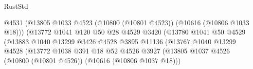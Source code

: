 \begin{lexlean}{RustStd}
\begin{coremodule}
                                                    @4531
                                                    (@13805
                                                      @1033
                                                      @4523
                                                      (@10800 (@10801 @4523))
                                                      (@10616 (@10806 @1033 @18)))
                                                    (@13772
                                                      @1041
                                                      @120
                                                      @50
                                                      @28
                                                      @4529
                                                      @3420
                                                      (@13780
                                                        @1041
                                                        @50
                                                        @4529
                                                        (@13883
                                                          @1040
                                                          @13299
                                                          @3426
                                                          @4528
                                                          @3895
                                                          @11136
                                                          (@13767
                                                            @1040
                                                            @13299
                                                            @4528
                                                            (@13772
                                                              @1038
                                                              @391
                                                              @18
                                                              @52
                                                              @4526
                                                              @3927
                                                              (@13805
                                                                @1037
                                                                @4526
                                                                (@10800 (@10801 @4526))
                                                                (@10616 (@10806 @1037 @18)))

\end{coremodule}
\end{lexlean}
